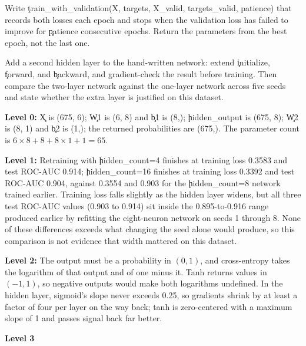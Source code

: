 
Write \c{train_with_validation(X, targets, X_valid, targets_valid, patience)}
that records both losses each epoch and stops when the validation loss has failed
to improve for \c{patience} consecutive epochs. Return the parameters from the
best epoch, not the last one.


Add a second hidden layer to the hand-written network: extend \c{initialize},
\c{forward}, and \c{backward}, and gradient-check the result before training.
Then compare the two-layer network against the one-layer network across five
seeds and state whether the extra layer is justified on this dataset.


\textbf{Level 0:} \c{X} is (675, 6); \c{W1} is (6, 8) and \c{b1} is (8,);
\c{hidden_output} is (675, 8); \c{W2} is (8, 1) and \c{b2} is (1,); the returned
probabilities are (675,). The parameter count is
$6 \times 8 + 8 + 8 \times 1 + 1 = 65$.

\textbf{Level 1:} Retraining with \c{hidden_count=4} finishes at training loss
0.3583 and test ROC-AUC 0.914; \c{hidden_count=16} finishes at training loss
0.3392 and test ROC-AUC 0.904, against 0.3554 and 0.903 for the
\c{hidden_count=8} network trained earlier. Training loss falls slightly as the
hidden layer widens, but all three test ROC-AUC values (0.903 to 0.914) sit
inside the 0.895-to-0.916 range produced earlier by refitting the eight-neuron
network on seeds 1 through 8. None of these differences exceeds what changing
the seed alone would produce, so this comparison is not evidence that width
mattered on this dataset.

\textbf{Level 2:} The output must be a probability in $(0, 1)$, and cross-entropy
takes the logarithm of that output and of one minus it. Tanh returns values in
$(-1, 1)$, so negative outputs would make both logarithms undefined. In the
hidden layer, sigmoid's slope never exceeds 0.25, so gradients shrink by at least
a factor of four per layer on the way back; tanh is zero-centered with a maximum
slope of 1 and passes signal back far better.

\textbf{Level 3}

